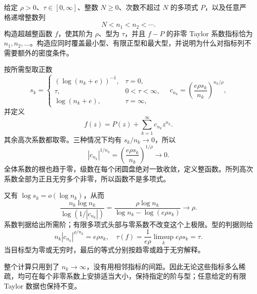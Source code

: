 \begin{exercise}[稀疏系数的阶型构造]\label{b3:ex:19-draft-02}
给定 \(\rho>0\)、\(\tau\in[0,\infty]\)、整数 \(N\ge0\)、次数不超过 \(N\) 的多项式 \(P\)，以及任意严格递增整数列
\[
 N<n_1<n_2<\cdots.
\]
构造超越整函数 \(f\)，使其阶为 \(\rho\)、型为 \(\tau\)，并且 \(f-P\) 的非零 Taylor 系数指标恰为 \(n_1,n_2,\ldots\)。构造应同时覆盖最小型、有限正型和最大型，并说明为什么对指标列不需要额外的密度条件。
\end{exercise}
\begin{solution}
按所需型取正数
\[
 s_k=
 \begin{cases}
 (\log(n_k+e))^{-1},&\tau=0,\\
 \tau,&0<\tau<\infty,\\
 \log(n_k+e),&\tau=\infty,
 \end{cases}
 \quad
 c_{n_k}=\left(\frac{e\rho s_k}{n_k}\right)^{n_k/\rho},
\]
并定义
\[
 f(z)=P(z)+\sum_{k=1}^\infty c_{n_k}z^{n_k}.
\]
其余高次系数都取零。三种情况下均有 \(s_k/n_k\to0\)，所以
\[
 |c_{n_k}|^{1/n_k}=\left(\frac{e\rho s_k}{n_k}\right)^{1/\rho}\longrightarrow0.
\]
全体系数的根也趋于零，级数在每个闭圆盘绝对一致收敛，定义整函数。所列高次系数全部为正且无穷多个非零，所以函数不是多项式。

又有 \(\log s_k=o(\log n_k)\)，从而
\[
 \frac{n_k\log n_k}{\log(1/|c_{n_k}|)}
 =\frac{\rho\log n_k}{\log n_k-\log(e\rho s_k)}
 \longrightarrow\rho.
\]
系数判据给出所需阶；有限多项式头部与零系数不改变这个上极限。型的判据则给
\[
 n_k|c_{n_k}|^{\rho/n_k}=e\rho s_k,\quad
 \tau(f)=\frac1{e\rho}\limsup_k e\rho s_k=\tau.
\]
当目标型为零或无穷时，最后的等式分别按趋零或趋于无穷解释。

整个计算只用到了 \(n_k\to\infty\)，没有用相邻指标的间距。因此无论这些指标多么稀疏，均可在每个非零系数上安排适当大小，保持指定的阶与型；任意给定的有限 Taylor 数据也保持不变。
\end{solution}

